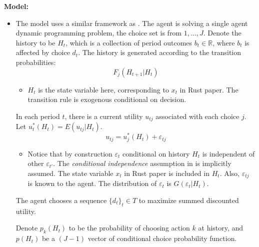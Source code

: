\documentclass{book}
\theoremstyle{plain}
\theoremstyle{definition}
\newcommand{\R}{\mathbb{R}}			%
\begin{document}
\vspace{1em}
\noindent
\textbf{Model:}
\begin{itemize}
	\item The model uses a similar framework as \cite{Rust:1987hn}. The agent is solving a single agent dynamic programming problem, the choice set is from $1,\dots,J$.
	Denote the history to be $H_t$, which is a collection of period outcomes $b_t\in \R$, where $b_t$ is affected by choice $d_t$. The history is generated according to the transition probabilities:
	\[F_j(H_{t+1}|H_t)\]
	\begin{itemize}
		\item $H_t$ is the state variable here, corresponding to $x_t$ in Rust paper. The transition rule is exogenous conditional on decision.
	\end{itemize}
	In each period $t$, there is a current utility $u_{tj}$ associated with each choice $j$. Let $u^*_t(H_t)=E(u_{tj}|H_t)$.
	\[u_{tj}=u^*_j(H_t)+\varepsilon_{tj}\]
	\begin{itemize}
		\item Notice that by construction $\varepsilon_t$ conditional on history $H_t$ is independent of other $\varepsilon_{t'}$. The \textit{conditional independence} assumption in \cite{Rust:1987hn} is implicitly assumed.
	The state variable $x_t$ in Rust paper is included in $H_t$. Also, $\varepsilon_{tj}$ is known to the agent.
	The distribution of $\varepsilon_t$ is $G(\varepsilon_t|H_t)$.
	\end{itemize}
	The agent chooses a sequence $\{d_t\}_t\in T$ to maximize summed discounted utility.

	Denote $p_k(H_t)$ to be the probability of choosing action $k$ at history, and $p(H_t)$ be a $(J-1)$ vector of conditional choice probability function.


\end{itemize}
\end{document}
